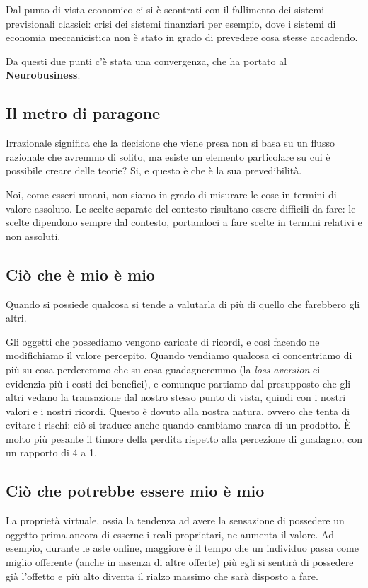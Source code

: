 Dal punto di vista economico ci si è scontrati con il fallimento dei sistemi
previsionali classici: crisi dei sistemi finanziari per esempio, dove i sistemi
di economia meccanicistica non è stato in grado di prevedere cosa stesse
accadendo.

Da questi due punti c'è stata una convergenza, che ha portato al
\textbf{Neurobusiness}.

\subsection{Il metro di paragone}

Irrazionale significa che la decisione che viene presa non si basa su un flusso
razionale che avremmo di solito, ma esiste un elemento particolare su cui
è possibile creare delle teorie? Si, e questo è che è la sua prevedibilità.

Noi, come esseri umani, non siamo in grado di misurare le cose in termini di
valore assoluto.
Le scelte separate del contesto risultano essere difficili da fare: le scelte
dipendono sempre dal contesto, portandoci a fare scelte in termini relativi e
non assoluti.


\subsection{Ciò che è mio è mio}
Quando si possiede qualcosa si tende a valutarla di più di quello che farebbero
gli altri.


Gli oggetti che possediamo vengono caricate di ricordi, e così facendo ne
modifichiamo il valore percepito. Quando vendiamo qualcosa ci concentriamo di
più su cosa perderemmo che su cosa guadagneremmo (la \textit{loss aversion} ci
evidenzia più i costi dei benefici), e comunque partiamo dal presupposto che
gli altri vedano la transazione dal nostro stesso punto di vista, quindi con i
nostri valori e i nostri ricordi.
Questo è dovuto alla nostra natura, ovvero che tenta di evitare i rischi: ciò
si traduce anche quando cambiamo marca di un prodotto.
È molto più pesante il timore della perdita rispetto alla percezione di
guadagno, con un rapporto di 4 a 1.

\subsection{Ciò che potrebbe essere mio è mio}
La proprietà virtuale, ossia la tendenza ad avere la sensazione di possedere un
oggetto prima ancora di esserne i reali proprietari, ne aumenta il valore. Ad
esempio, durante le aste online, maggiore è il tempo che un individuo passa come
miglio offerente (anche in assenza di altre offerte) più egli si sentirà di
possedere già l'offetto e più alto diventa il rialzo massimo che sarà disposto a
fare.

